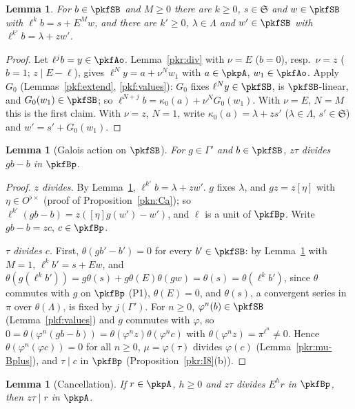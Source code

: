 \documentclass[10pt]{amsart}
\newtheorem{lemma}[theorem]{Lemma}
\theoremstyle{definition}
\theoremstyle{remark}
\begin{document}
\begin{lemma}\label{pkl:SBdec}
For $b\in\pkfSB$ and $M\ge0$ there are $k\ge0$, $s\in\mathfrak S$ and $w\in\pkfSB$ with $\ell^kb=s+E^Mw$, and there are
$k'\ge0$, $\lambda\in\Lambda$ and $w'\in\pkfSB$ with $\ell^{k'}b=\lambda+zw'$.
\end{lemma}

\begin{proof}
Let $\ell^jb=y\in\pkfAo$. Lemma~\ref{pkr:div} with $\nu=E$ ($b=0$), resp.\ $\nu=z$ ($b=1$; $z\mid E-\ell$), gives
$\ell^Ny=a+\nu^Nw_1$ with $a\in\pkpA$, $w_1\in\pkfAo$. Apply $G_0$ (Lemmas~\ref{pkf:extend}, \ref{pkf:values}): $G_0$ fixes
$\ell^Ny\in\pkfSB$, is $\pkfSB$-linear, and $G_0(w_1)\in\pkfSB$; so $\ell^{N+j}b=\kappa_0(a)+\nu^NG_0(w_1)$. With $\nu=E$,
$N=M$ this is the first claim. With $\nu=z$, $N=1$, write $\kappa_0(a)=\lambda+zs'$ ($\lambda\in\Lambda$, $s'\in\mathfrak S$)
and $w'=s'+G_0(w_1)$.
\end{proof}

\begin{lemma}[Galois action on $\pkfSB$]\label{pkl:galSB}
For $g\in\Gamma'$ and $b\in\pkfSB$, $z\tau$ divides $gb-b$ in $\pkfBp$.
\end{lemma}

\begin{proof}
\emph{$z$ divides.} By Lemma~\ref{pkl:SBdec}, $\ell^{k'}b=\lambda+zw'$. $g$ fixes $\lambda$, and $gz=z[\eta]$ with
$\eta\in O^{\flat\times}$ (proof of Proposition~\ref{pkn:Ca}); so $\ell^{k'}(gb-b)=z([\eta]g(w')-w')$, and $\ell$ is a unit of
$\pkfBp$. Write $gb-b=zc$, $c\in\pkfBp$.

\emph{$\tau$ divides $c$.} First, $\theta(gb'-b')=0$ for every $b'\in\pkfSB$: by Lemma~\ref{pkl:SBdec} with $M=1$,
$\ell^kb'=s+Ew$, and $\theta(g(\ell^kb'))=g\theta(s)+g\theta(E)\theta(gw)=\theta(s)=\theta(\ell^kb')$, since $\theta$ commutes with
$g$ on $\pkfBp$ (P1), $\theta(E)=0$, and $\theta(s)$, a convergent series in $\pi$ over $\theta(\Lambda)$, is fixed by
$j(\Gamma')$. For $n\ge0$, $\varphi^n(b)\in\pkfSB$ (Lemma~\ref{pkf:values}) and $g$ commutes with $\varphi$, so
$0=\theta(\varphi^n(gb-b))=\theta(\varphi^nz)\theta(\varphi^nc)$ with $\theta(\varphi^nz)=\pi^{\ell^n}\ne0$. Hence
$\theta(\varphi^n(\varphi c))=0$ for all $n\ge0$, $\mu=\varphi(\tau)$ divides $\varphi(c)$ (Lemma~\ref{pkr:mu-Bplus}), and
$\tau\mid c$ in $\pkfBp$ (Proposition~\ref{pkr:I8}(b)).
\end{proof}

\begin{lemma}[Cancellation]\label{pkl:cancel}
If $r\in\pkpA$, $h\ge0$ and $z\tau$ divides $E^hr$ in $\pkfBp$, then $z\tau\mid r$ in $\pkpA$.
\end{lemma}
\end{document}
